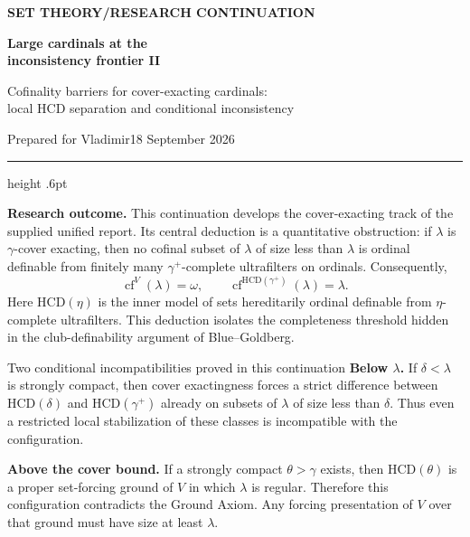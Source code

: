 \documentclass[11pt,letterpaper]{article}
\theoremstyle{definition}
\newcommand{\cf}{\operatorname{cf}}
\newcommand{\HCD}{\mathrm{HCD}}
\numberwithin{equation}{section}
\begin{document}
\thispagestyle{empty}
{\sffamily\bfseries\small\color{Olive}SET THEORY\quad /\quad RESEARCH CONTINUATION}

\vspace{13pt}
{\fontsize{28}{31}\selectfont\bfseries\color{Forest}Large cardinals at the\\ inconsistency frontier II\par}
\vspace{10pt}
{\fontsize{14}{18}\selectfont Cofinality barriers for cover-exacting cardinals:\\ local HCD separation and conditional inconsistency\par}
\vspace{14pt}
{\color{Muted}Prepared for Vladimir\hfill 18 September 2026\par}
\vspace{3pt}
{\color{Sage}\hrule height .6pt}
\vspace{12pt}

\textbf{Research outcome.} This continuation develops the cover-exacting track of the supplied unified report. Its central deduction is a quantitative obstruction: if $\lambda$ is $\gamma$-cover exacting, then no cofinal subset of $\lambda$ of size less than $\lambda$ is ordinal definable from finitely many $\gamma^+$-complete ultrafilters on ordinals. Consequently,
\[
 \cf^V(\lambda)=\omega,
 \qquad \cf^{\HCD(\gamma^+)}(\lambda)=\lambda.
\]
Here $\HCD(\eta)$ is the inner model of sets hereditarily ordinal definable from $\eta$-complete ultrafilters. This deduction isolates the completeness threshold hidden in the club-definability argument of Blue--Goldberg.

\begin{assessment}{Two conditional incompatibilities proved in this continuation}
\textbf{Below $\lambda$.} If $\delta<\lambda$ is strongly compact, then cover exactingness forces a strict difference between $\HCD(\delta)$ and $\HCD(\gamma^+)$ already on subsets of $\lambda$ of size less than $\delta$. Thus even a restricted local stabilization of these classes is incompatible with the configuration.

\textbf{Above the cover bound.} If a strongly compact $\theta>\gamma$ exists, then $\HCD(\theta)$ is a proper set-forcing ground of $V$ in which $\lambda$ is regular. Therefore this configuration contradicts the Ground Axiom. Any forcing presentation of $V$ over that ground must have size at least $\lambda$.
\end{assessment}
\end{document}
